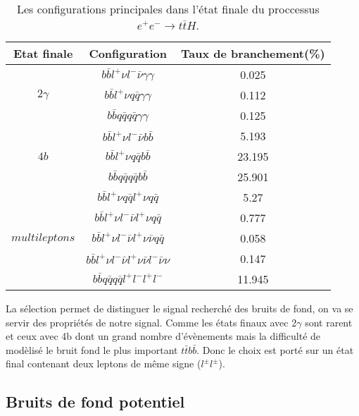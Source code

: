 \begin{table}[H]
  \centering
  \begin{tabular}{|c|c|c|}
    \hline Etat finale & Configuration & Taux de branchement(\%) \\
    \hline 
    \multirow{3}{*}{$2\gamma$} & $b\bar{b}l^{+}{\nu}l^{-}\bar{\nu}\gamma\gamma$ & 0.025  \rule[-7pt]{0pt}{20pt}\\
      & $b\bar{b}l^{+}{\nu}q\bar{q}\gamma\gamma$ & 0.112  \rule[-7pt]{0pt}{20pt}\\
      & $b\bar{b}q\bar{q}q\bar{q}\gamma\gamma$ & 0.125  \rule[-7pt]{0pt}{20pt}\\
    \hline
    \multirow{3}{*}{$4b$} &  $b\bar{b}l^{+}{\nu}l^{-}\bar{\nu}b\bar{b}$ & 5.193  \rule[-7pt]{0pt}{20pt}\\
      & $b\bar{b}l^{+}{\nu}q\bar{q}b\bar{b}$ & 23.195  \rule[-7pt]{0pt}{20pt}\\
      & $b\bar{b}q\bar{q}q\bar{q}b\bar{b}$ & 25.901  \rule[-7pt]{0pt}{20pt}\\
    \hline
    \multirow{5}{*}{$multileptons$} &  $b\bar{b}l^{+}{\nu}q\bar{q}l^{+}{\nu}q\bar{q}$ & 5.27  \rule[-7pt]{0pt}{20pt}\\
      & $b\bar{b}l^{+}{\nu}l^{-}\bar{\nu}l^{+}{\nu}q\bar{q}$ & 0.777  \rule[-7pt]{0pt}{20pt}\\
      & $b\bar{b}l^{+}{\nu}l^{-}\bar{\nu}l^{+}{\nu}\bar{\nu}q\bar{q}$ & 0.058  \rule[-7pt]{0pt}{20pt}\\
      & $b\bar{b}l^{+}{\nu}l^{-}\bar{\nu}l^{+}{\nu}\bar{\nu}l^{-}\bar{\nu}{\nu}$ & 0.147  \rule[-7pt]{0pt}{20pt}\\
      & $b\bar{b}q\bar{q}q\bar{q}l^{+}l^{-}l^{+}l^{-}$ & 11.945  \rule[-7pt]{0pt}{20pt}\\
    \hline    
  \end{tabular}
  \caption{Les configurations principales dans l'\'etat finale du proccessus $e^{+}e^{-}{\rightarrow}t\bar{t}H$.}
  \label{table:3.1}
\end{table}

La s\'election permet de distinguer le signal recherch\'e des bruits de fond, on va se servir des propri\'et\'es de notre signal. Comme les états finaux avec 2$\gamma$ sont rarent et ceux avec 4b dont un grand nombre d'évènements mais la difficulté de modèlisé le bruit fond le plus important $t\bar{t}b\bar{b}$. Donc le choix est porté sur un \'etat final contenant deux leptons de m\^eme signe ($l^{\pm}l^{\pm}$).

\subsection{Bruits de fond potentiel}


